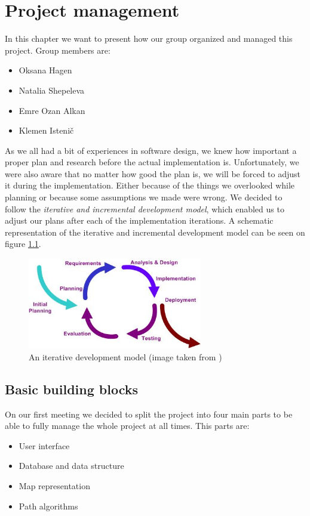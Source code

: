 
\chapter{Project management} %

\label{Chapter2} %


In this chapter we want to present how our group organized and managed this project. Group members are:
\begin{itemize}
\item Oksana Hagen
\item Natalia Shepeleva
\item Emre Ozan Alkan
\item Klemen Istenič
\end{itemize}
As we all had a bit of experiences in software design, we knew how important a proper plan and research before the actual implementation is. Unfortunately, we were also aware that no matter how good the plan is, we will be forced to adjust it during the implementation. Either because of the things we overlooked while planning or because some assumptions we made were wrong. We decided to follow the \textit{iterative and incremental development model}, which enabled us to adjust our plans after each of the implementation iterations. A schematic representation of the iterative and incremental development model can be seen on figure \ref{fig:Iterative_development_model_V2}.
\begin{figure}[h]
\centering
\includegraphics[height=4cm]{../pictures/Iterative_development_model_V2}
\caption{An iterative development model (image taken from \cite{wiki1})}
\label{fig:Iterative_development_model_V2}
\end{figure}

\section{Basic building blocks}
\label{Building blocks}
On our first meeting we decided to split the project into four main parts to be able to fully manage the whole project at all times. This parts are:
\begin{itemize}
\item User interface
\item Database and data structure
\item Map representation
\item Path algorithms
\end{itemize}

